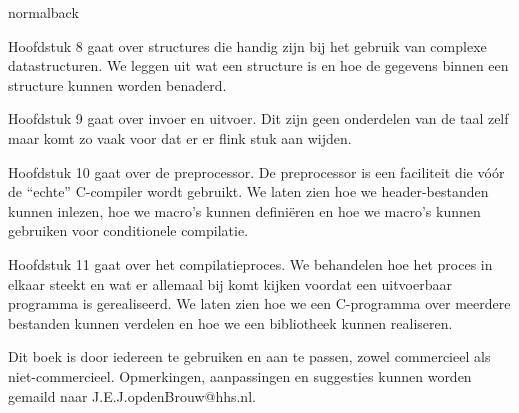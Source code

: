 \documentclass[spinewidth=10.44mm]{bookcover}
\begin{document}
\begin{bookcover}
\begin{bookcoverelement}{normal}{back}
{Hoofdstuk 8 gaat over structures die handig zijn bij het gebruik van complexe datastructuren. We leggen uit wat een structure is en hoe de gegevens binnen een structure kunnen worden benaderd. 

Hoofdstuk 9 gaat over invoer en uitvoer. Dit zijn geen onderdelen van de taal zelf maar komt zo vaak voor dat er er flink stuk aan wijden.

Hoofdstuk 10 gaat over de preprocessor. De preprocessor is een faciliteit die vóór de ``echte'' C-compiler wordt gebruikt. We laten zien hoe we header-bestanden kunnen inlezen, hoe we macro's kunnen definiëren en hoe we macro's kunnen gebruiken voor conditionele compilatie.

Hoofdstuk 11 gaat over het compilatieproces. We behandelen hoe het proces in elkaar steekt en wat er allemaal bij komt kijken voordat een uitvoerbaar programma is gerealiseerd. We laten zien hoe we een C-programma over meerdere bestanden kunnen verdelen en hoe we een bibliotheek kunnen realiseren.

Dit boek is door iedereen te gebruiken en aan te passen, zowel commercieel als niet-commercieel. Opmerkingen, aanpassingen en suggesties kunnen worden gemaild naar J.E.J.opdenBrouw@hhs.nl.
}
\vfill
\end{bookcoverelement}
\end{bookcover}
\end{document}
